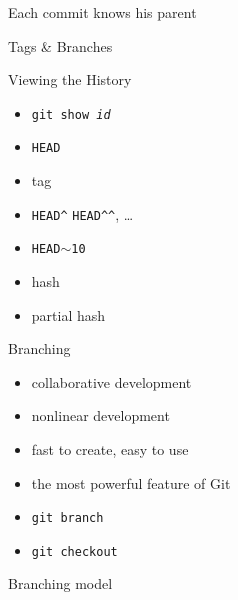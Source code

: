 \documentclass{beamer}
\begin{document}
\begin{frame}{Each commit knows his parent}
  \begin{center}
  \end{center}
\end{frame}

\begin{frame}{Tags \& Branches}
  \begin{center}
  \end{center}
\end{frame}

\begin{frame}{Viewing the History}
  \begin{itemize}
    \item \texttt{git show \textit{id}}
  \end{itemize}
  \pause
  \begin{itemize}
    \item \texttt{HEAD}
    \item tag
    \item \texttt{HEAD\textasciicircum}
      \texttt{HEAD\textasciicircum\textasciicircum}, \ldots
    \item \texttt{HEAD$\sim$10}
    \item hash
    \item partial hash
  \end{itemize}
\end{frame}

\begin{frame}{Branching}
  \begin{itemize}
    \item collaborative development
    \item nonlinear development
    \item fast to create, easy to use
    \item the most powerful feature of Git
  \end{itemize}
  \begin{itemize}
    \item \texttt{git branch}
    \item \texttt{git checkout}
  \end{itemize}
\end{frame}

\begin{frame}{Branching model}
  \begin{center}
  \end{center}
\end{frame}
\end{document}
